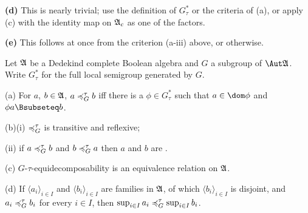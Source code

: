 {\medskip

{\bf (d)} This is nearly trivial;  use the definition of $G^*_{\tau}$ or
the criteria of (a), or apply (c) with the identity map on $\frak A_c$
as one of the factors.

\medskip

{\bf (e)} This follows at once from the criterion (a-iii) above, or
otherwise.
}%

 Let $\frak A$ be a Dedekind complete Boolean
algebra and $G$ a subgroup of $\Aut\frak A$.   Write $G^*_{\tau}$ for
the full local semigroup generated by $G$.

(a) For $a$, $b\in\frak A$, $a\preccurlyeq^{\tau}_G b$ iff there is a
$\phi\in G^*_{\tau}$ such that $a\in\dom\phi$ and $\phi a\Bsubseteq b$.

(b)(i) $\preccurlyeq^{\tau}_G$ is transitive and reflexive;

\quad(ii) if $a\preccurlyeq^{\tau}_G b$ and $b\preccurlyeq^{\tau}_G a$ then $a$ and $b$ are \Gte.

(c) $G$-$\tau$-equidecomposability is an equivalence relation on
$\frak A$.

(d) If $\langle a_i\rangle_{i\in I}$ and $\langle b_i\rangle_{i\in I}$
are families in $\frak A$, of which $\langle b_i\rangle_{i\in I}$ is
disjoint, and $a_i\preccurlyeq^{\tau}_G b_i$ for every $i\in I$, then
$\sup_{i\in I}a_i\preccurlyeq^{\tau}_G\sup_{i\in I}b_i$.

